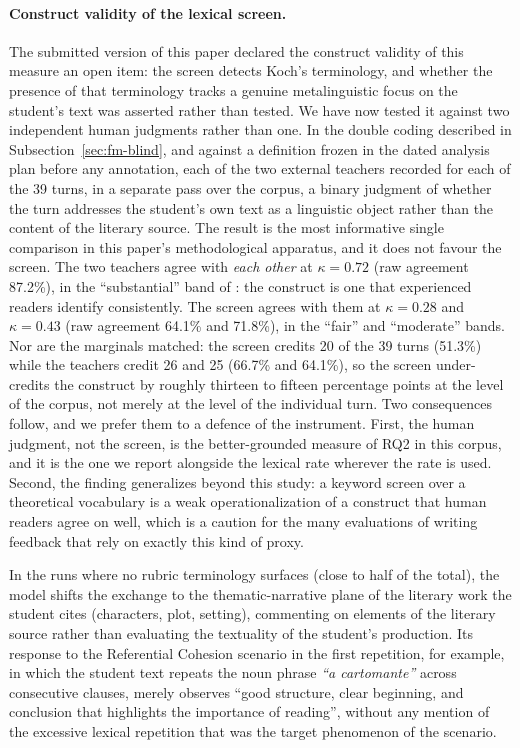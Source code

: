 \documentclass{sbc2023}%
\begin{document}
\paragraph{Construct validity of the lexical screen.} The submitted version of this paper declared the construct validity of this measure an open item: the screen detects Koch's terminology, and whether the presence of that terminology tracks a genuine metalinguistic focus on the student's text was asserted rather than tested. We have now tested it against two independent human judgments rather than one. In the double coding described in Subsection~\ref{sec:fm-blind}, and against a definition frozen in the dated analysis plan before any annotation, each of the two external teachers recorded for each of the 39 turns, in a separate pass over the corpus, a binary judgment of whether the turn addresses the student's own text as a linguistic object rather than the content of the literary source. The result is the most informative single comparison in this paper's methodological apparatus, and it does not favour the screen. The two teachers agree with \textit{each other} at $\kappa = 0.72$ (raw agreement 87.2\%), in the ``substantial'' band of \citet{landis1977measurement}: the construct is one that experienced readers identify consistently. The screen agrees with them at $\kappa = 0.28$ and $\kappa = 0.43$ (raw agreement 64.1\% and 71.8\%), in the ``fair'' and ``moderate'' bands. Nor are the marginals matched: the screen credits 20 of the 39 turns (51.3\%) while the teachers credit 26 and 25 (66.7\% and 64.1\%), so the screen under-credits the construct by roughly thirteen to fifteen percentage points at the level of the corpus, not merely at the level of the individual turn. Two consequences follow, and we prefer them to a defence of the instrument. First, the human judgment, not the screen, is the better-grounded measure of RQ2 in this corpus, and it is the one we report alongside the lexical rate wherever the rate is used. Second, the finding generalizes beyond this study: a keyword screen over a theoretical vocabulary is a weak operationalization of a construct that human readers agree on well, which is a caution for the many evaluations of writing feedback that rely on exactly this kind of proxy.

In the runs where no rubric terminology surfaces (close to half of the total), the model shifts the exchange to the thematic-narrative plane of the literary work the student cites (characters, plot, setting), commenting on elements of the literary source rather than evaluating the textuality of the student's production. Its response to the Referential Cohesion scenario in the first repetition, for example, in which the student text repeats the noun phrase \textit{``a cartomante''} across consecutive clauses, merely observes ``good structure, clear beginning, and conclusion that highlights the importance of reading'', without any mention of the excessive lexical repetition that was the target phenomenon of the scenario.
\end{document}
